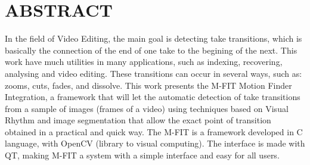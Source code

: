 \chapter*{\centering ABSTRACT \label{abstract}}

\hspace*{1.25cm}In the field of Video Editing, the main goal is
detecting take transitions, which is basically the
connection of the end of one take to the begining of the next. This work
have much utilities in many applications, such as indexing, recovering,
analysing and video editing. These transitions can occur in several
ways, such as: zooms, cuts, fades, and dissolve. This work presents
the M-FIT Motion Finder Integration, a framework that will let the
automatic detection of take transitions from a sample of images
(frames of a video) using techniques based on Visual Rhythm and
image segmentation that allow the exact point of transition 
obtained in a practical and quick way. The M-FIT is a framework
developed in C language, with OpenCV (library to visual computing).
The interface is made with QT, making M-FIT a system with a simple
interface and easy for all users.
